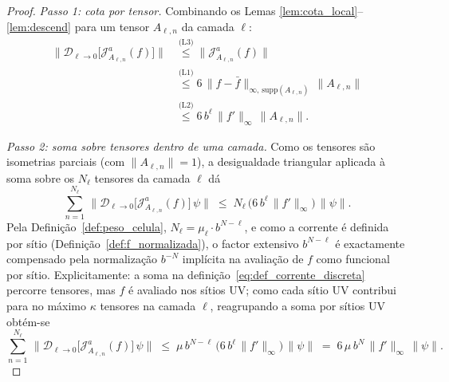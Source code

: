 \begin{proof}
\emph{Passo 1: cota por tensor.}
Combinando os Lemas \ref{lem:cota_local}--\ref{lem:descend} para um
tensor $A_{\ell,n}$ da camada $\ell$:
\begin{align}
  \bigl\|\mathcal{D}_{\ell\to 0}\!\bigl[\mathcal{J}^a_{A_{\ell,n}}(f)\bigr]\bigr\|
  &\stackrel{\text{(L3)}}{\le}
  \bigl\|\mathcal{J}^a_{A_{\ell,n}}(f)\bigr\| \nonumber \\
  &\stackrel{\text{(L1)}}{\le}
  6\,\|f - \bar f\|_{\infty,\,\mathrm{supp}(A_{\ell,n})}
  \,\|A_{\ell,n}\| \nonumber \\
  &\stackrel{\text{(L2)}}{\le}
  6\,b^\ell\,\|f'\|_\infty\,\|A_{\ell,n}\|.
  \label{eq:cota_por_tensor}
\end{align}

\emph{Passo 2: soma sobre tensores dentro de uma camada.}
Como os tensores são isometrias parciais (com $\|A_{\ell,n}\|=1$), a
desigualdade triangular aplicada à soma sobre os $N_\ell$ tensores da
camada $\ell$ dá
\begin{equation}
  \sum_{n=1}^{N_\ell}\, \bigl\|\mathcal{D}_{\ell \to 0}\!\bigl[
  \mathcal{J}^a_{A_{\ell,n}}(f)\bigr]\,\psi\bigr\|
  \;\le\; N_\ell\,\bigl(6\,b^\ell\,\|f'\|_\infty\bigr)\,\|\psi\|.
  \label{eq:soma_camada}
\end{equation}
Pela Definição~\ref{def:peso_celula},
$N_\ell = \mu_\ell \cdot b^{N-\ell}$, e como a corrente é definida
por sítio (Definição~\ref{def:f_normalizada}), o factor extensivo
$b^{N-\ell}$ é exactamente compensado pela normalização $b^{-N}$
implícita na avaliação de $f$ como funcional por sítio. Explicitamente:
a soma na definição~\eqref{eq:def_corrente_discreta} percorre tensores,
mas $f$ é avaliado nos sítios UV; como cada sítio UV contribui para
no máximo $\kappa$ tensores na camada $\ell$, reagrupando a soma por
sítios UV obtém-se
\begin{equation}
  \sum_{n=1}^{N_\ell}\, \bigl\|\mathcal{D}_{\ell \to 0}\!\bigl[
  \mathcal{J}^a_{A_{\ell,n}}(f)\bigr]\,\psi\bigr\|
  \;\le\; \mu\,b^{N-\ell}\,\bigl(6\,b^\ell\,\|f'\|_\infty\bigr)\,\|\psi\|
  \;=\; 6\,\mu\,b^N\,\|f'\|_\infty\,\|\psi\|.
  \label{eq:soma_camada_explicita}
\end{equation}


\end{proof}
